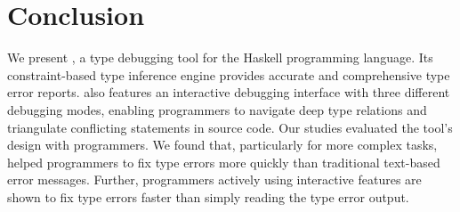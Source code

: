 \section{Conclusion}

We present \chameleon{}, a type debugging tool for the Haskell programming language. Its constraint-based type inference engine provides accurate and comprehensive type error reports. \chameleon{} also features an interactive debugging interface with three different debugging modes, enabling programmers to navigate deep type relations and triangulate conflicting statements in source code. Our studies evaluated the tool's design with programmers. We found that, particularly for more complex tasks, \chameleon{} helped programmers to fix type errors more quickly than traditional text-based error messages.  Further, programmers actively using \chameleon{} interactive features are shown to fix type errors faster than simply reading the type error output.